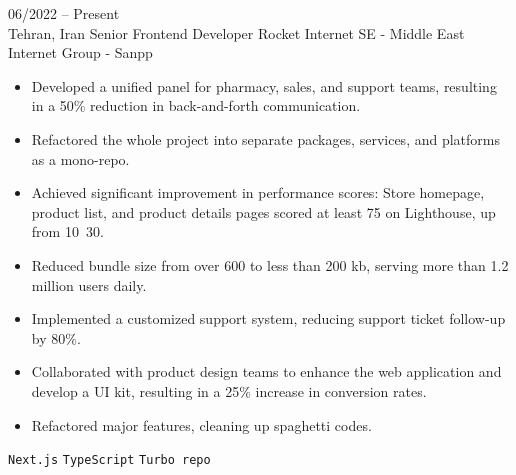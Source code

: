 \documentclass[8pt]{developercv} %
\begin{document}
    \vspace{-10 pt}
    \begin{entrylist}
        \entry
        {06/2022 -- Present \\ Tehran, Iran}
        {Senior Frontend Developer}
        {ًRocket Internet SE - Middle East Internet Group - Sanpp}
        {\vspace{-10pt}
            \begin{itemize}[noitemsep,topsep=0pt,parsep=0pt,partopsep=0pt, leftmargin=-1pt]
                \item Developed a unified panel for pharmacy, sales, and support teams, resulting in a 50\% reduction in back-and-forth communication.
                \item Refactored the whole project into separate packages, services, and platforms as a mono-repo.
                \item Achieved significant improvement in performance scores: Store homepage, product list, and product details pages scored at least 75 on Lighthouse, up from 10~30.
                \item Reduced bundle size from over 600 to less than 200 kb, serving more than 1.2 million users daily.
                \item Implemented a customized support system, reducing support ticket follow-up by 80\%.
                \item Collaborated with product design teams to enhance the web application and develop a UI kit, resulting in a 25\% increase in conversion rates.
                \item Refactored major features, cleaning up spaghetti codes.
            \end{itemize}
            \texttt{Next.js} \slashsep \texttt{TypeScript} \slashsep \texttt{Turbo repo}
        }


\end{entrylist}
\end{document}
